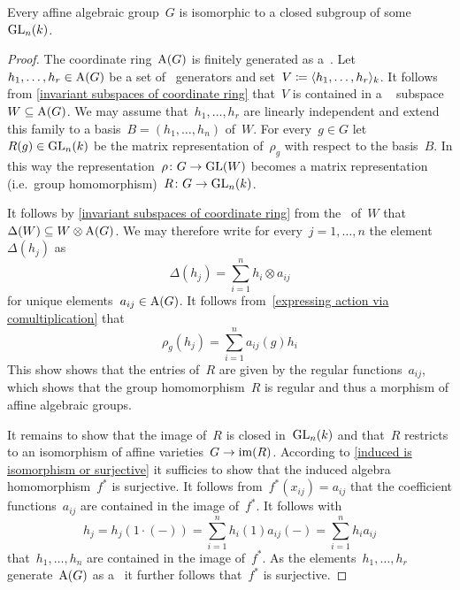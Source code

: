 \begin{theorem}
  \label{embedding theorem}
  Every affine algebraic group~$G$ is isomorphic to a closed subgroup of some~$\operatorname{GL}_n(k)$.
\end{theorem}


\begin{proof}
  \label{embedding theorem proof}
  The coordinate ring~$\operatorname{A}(G)$ is finitely generated as a~.
  Let~$h_1, \dotsc, h_r \in \operatorname{A}(G)$ be a set of~ generators and set~$V \coloneqq \langle h_1, \dotsc, h_r\rangle_k$.
  It follows from \cref{invariant subspaces of coordinate ring} that~$V$ is contained in a {\fd}~ subspace~$W \subseteq \operatorname{A}(G)$.
  We may assume that~$h_1, \dotsc, h_r$ are linearly independent and extend this family to a basis~$B = (h_1, \dotsc, h_n)$ of~$W$.
  For every~$g \in G$ let~$R(g) \in \operatorname{GL}_n(k)$ be the matrix representation of~$\rho_g$ with respect to the basis~$B$.
  In this way the representation~$\rho \colon G \to \operatorname{GL}(W)$ becomes a matrix representation (i.e.\ group homomorphism)~$R \colon G \to \operatorname{GL}_n(k)$.
  
  It follows by \cref{invariant subspaces of coordinate ring} from the~ of~$W$ that~$\Delta(W) \subseteq W \otimes \operatorname{A}(G)$.
  We may therefore write for every~$j = 1, \dotsc, n$ the element~$\Delta(h_j)$ as
  \[
      \Delta(h_j)
    = \sum_{i=1}^n h_i \otimes a_{ij}
  \]
  for unique elements~$a_{ij} \in \operatorname{A}(G)$.
  It follows from~\eqref{expressing action via comultiplication} that
  \[
      \rho_g(h_j)
    = \sum_{i=1}^n a_{ij}(g) h_i
  \]
  This show shows that the entries of~$R$ are given by the regular functions~$a_{ij}$, which shows that the group homomorphism~$R$ is regular and thus a morphism of affine algebraic groups.
  
  It remains to show that the image of~$R$ is closed in~$\operatorname{GL}_n(k)$ and that~$R$ restricts to an isomorphism of affine varieties~$G \to \operatorname{im}(R)$.
  According to \cref{induced is isomorphism or surjective} it sufficies to show that the induced algebra homomorphism~$f^*$ is surjective.
  It follows from~$f^*(x_{ij}) = a_{ij}$ that the coefficient functions~$a_{ij}$ are contained in the image of~$f^*$.
  It follows with
  \[
      h_j
    = h_j(1 \cdot (-))
    = \sum_{i=1}^n h_i(1) a_{ij}(-)
    = \sum_{i=1}^n h_i a_{ij}
  \]
  that~$h_1, \dotsc, h_n$ are contained in the image of~$f^*$.
  As the elements~$h_1, \dotsc, h_r$ generate~$\operatorname{A}(G)$ as a~ it further follows that~$f^*$ is surjective.
\end{proof}


